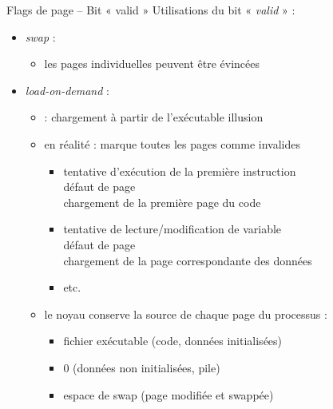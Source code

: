 \begin {frame} {Flags de page -- Bit « valid »}
    Utilisations du bit « \textit {valid} » : 

    \begin {itemize}
	\item \textit {swap} :
	    \begin {itemize}
		\item les pages individuelles peuvent être évincées
	    \end {itemize}
	\item \textit {load-on-demand} :
	    \begin {itemize}
		\item {} : chargement à partir de l'exécutable
		    \implique illusion
		\item en réalité :  marque toutes les pages
		    comme invalides
		    \begin {itemize}
			\item tentative d'exécution de la première instruction
			    \\
			    \implique défaut de page \\
			    \implique chargement de la première page du code
			\item tentative de lecture/modification de variable
			    \\
			    \implique défaut de page
			    \\
			    \implique chargement de la page correspondante
			    des données

			\item etc.
		    \end {itemize}
		\item le noyau conserve la source de chaque page du processus :
		    \begin {itemize}
			\item fichier exécutable (code, données initialisées)
			\item 0 (données non initialisées, pile)
			\item espace de swap (page modifiée et swappée)
		    \end {itemize}
	    \end {itemize}
    \end {itemize}
\end {frame}

